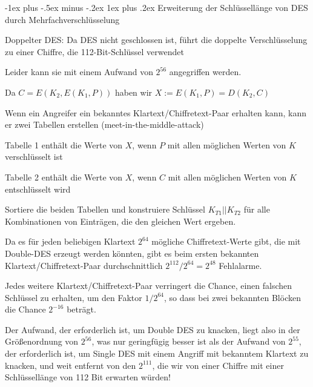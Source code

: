 \documentclass[a4paper]{article}
\makeatletter
\renewcommand{\subsubsection}{\@startsection{subsubsection}{3}{0mm}%
 {-1ex plus -.5ex minus -.2ex}%
 {1ex plus .2ex}%
 {\normalfont\small\bfseries}}
\makeatother
\begin{document}
\begin{multicols}{3}
      \subsubsection{Erweiterung der Schlüssellänge von DES durch Mehrfachverschlüsselung}
      \begin{itemize*}
            \item Doppelter DES: Da DES nicht geschlossen ist, führt die doppelte Verschlüsselung zu einer Chiffre, die 112-Bit-Schlüssel verwendet
            \begin{itemize*}
                  \item Leider kann sie mit einem Aufwand von $2^{56}$ angegriffen werden.
                  \item Da $C=E(K_2,E(K_1,P))$ haben wir $X:=E(K_1,P)=D(K_2,C)$
                  \item Wenn ein Angreifer ein bekanntes Klartext/Chiffretext-Paar erhalten kann, kann er zwei Tabellen erstellen (meet-in-the-middle-attack)
                  \begin{itemize*}
                        \item Tabelle 1 enthält die Werte von $X$, wenn $P$ mit allen möglichen Werten von $K$ verschlüsselt ist
                        \item Tabelle 2 enthält die Werte von $X$, wenn $C$ mit allen möglichen Werten von $K$ entschlüsselt wird
                        \item Sortiere die beiden Tabellen und konstruiere Schlüssel $K_{T1}|| K_{T2}$ für alle Kombinationen von Einträgen, die den gleichen Wert ergeben.
                  \end{itemize*}
            \end{itemize*}
            \item Da es für jeden beliebigen Klartext $2^{64}$ mögliche Chiffretext-Werte gibt, die mit Double-DES erzeugt werden könnten, gibt es beim ersten bekannten Klartext/Chiffretext-Paar durchschnittlich $2^{112}/2^{64}=2^{48}$ Fehlalarme.
            \item Jedes weitere Klartext/Chiffretext-Paar verringert die Chance, einen falschen Schlüssel zu erhalten, um den Faktor $1/2^{64}$, so dass bei zwei bekannten Blöcken die Chance $2^{-16}$ beträgt.
            \item Der Aufwand, der erforderlich ist, um Double DES zu knacken, liegt also in der Größenordnung von $2^{56}$, was nur geringfügig besser ist als der Aufwand von $2^{55}$, der erforderlich ist, um Single DES mit einem Angriff mit bekanntem Klartext zu knacken, und weit entfernt von den $2^{111}$, die wir von einer Chiffre mit einer Schlüssellänge von 112 Bit erwarten würden!

\end{itemize*}
\end{multicols}
\end{document}
